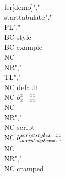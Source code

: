 fer[demo]","\\starttabulate","\\FL","\\BC style         \\BC example \\NC \\NR","\\TL","\\NC default       \\NC $b_{x=xx}^{x=xx}$ \\NC \\NR","\\NC script        \\NC $b_{\\scriptstyle x=xx}^{\\scriptstyle x=xx}$ \\NC \\NR","\\NC cramped
